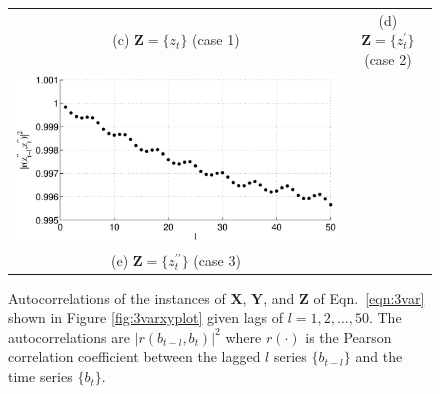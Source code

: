 \documentclass{article}[10pt]
\begin{document}
\begin{figure}[ht]
\begin{tabular}{cc}
(c) $\mathbf{Z} = \{z_t\}$ (case 1)& (d) $\mathbf{Z} = \{z_t^\prime\}$ (case 2)\\
\includegraphics[scale=0.48]{NoisyMultiResponseExample_autocorrZ3.eps} &  \\
(e) $\mathbf{Z} = \{z_t^{\prime\prime}\}$ (case 3)& 
\end{tabular}
\caption{Autocorrelations of the instances of $\mathbf{X}$, $\mathbf{Y}$, and $\mathbf{Z}$ of Eqn.\ \ref{eqn:3var} shown in Figure \ref{fig:3varxyplot} given lags of $l=1,2,\ldots,50$.  The autocorrelations are $|r(b_{t-l},b_t)|^2$ where $r(\cdot)$ is the Pearson correlation coefficient between the lagged $l$ series $\{b_{t-l}\}$ and the time series $\{b_{t}\}$.}
\label{fig:3varxyautocorr}
\end{figure}
\end{document}
